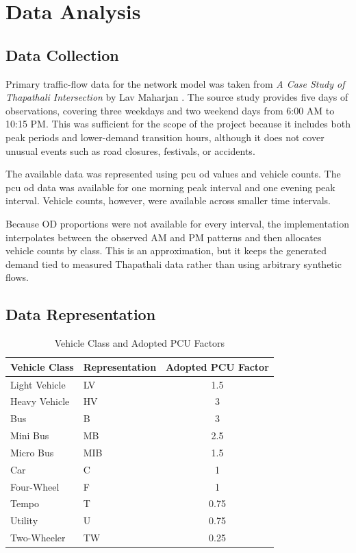 \section{Data Analysis}
\label{sec:data_analysis}

\subsection{Data Collection}
\label{subsec:data_collection}
Primary traffic-flow data for the network model was taken from \textit{A Case Study of Thapathali Intersection} by Lav Maharjan \cite{maharjan2023performance}. The source study provides five days of observations, covering three weekdays and two weekend days from 6:00 AM to 10:15 PM. This was sufficient for the scope of the project because it includes both peak periods and lower-demand transition hours, although it does not cover unusual events such as road closures, festivals, or accidents.

The available data was represented using \gls{pcu} \gls{od} values and
vehicle counts. The \gls{pcu} \gls{od} data was available for one morning
peak interval and one evening peak interval. Vehicle counts, however,
were available across smaller time intervals.

Because OD proportions were not available for every interval, the
implementation interpolates between the observed AM and PM patterns and
then allocates vehicle counts by class. This is an approximation, but it
keeps the generated demand tied to measured Thapathali data rather than
using arbitrary synthetic flows.

\subsection{Data Representation}
\label{subsec:data_representation}
\begin{table}[H]
    \centering
    \small
    \caption{Vehicle Class and Adopted PCU Factors}
    \label{tab:pcu_factors}
    \begin{tabular}{p{7cm}p{3cm}c}
        \toprule
        \textbf{Vehicle Class} & \textbf{Representation} & \textbf{Adopted PCU Factor} \\
        \midrule
        Light Vehicle & LV & 1.5 \\
        Heavy Vehicle & HV & 3 \\
        Bus & B & 3 \\
        Mini Bus & MB & 2.5 \\
        Micro Bus & MIB & 1.5 \\
        Car & C & 1 \\
        Four-Wheel & F & 1 \\
        Tempo & T & 0.75 \\
        Utility & U & 0.75 \\
        Two-Wheeler & TW & 0.25 \\
        \bottomrule
    \end{tabular}
\end{table}

